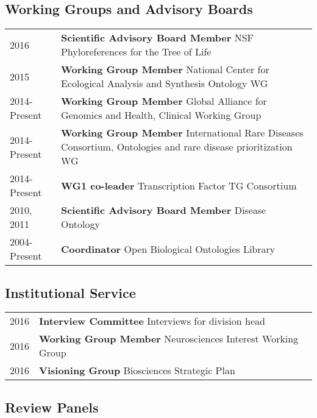 \documentclass[11pt,fullpage]{article}
\begin{document}
\subsection*{Working Groups and Advisory Boards}

\begin{longtable}{p{0.5in}|p{5.5in}}

  2016  & \textbf{Scientific Advisory Board Member} NSF Phyloreferences for the Tree of Life \\
  2015  & \textbf{Working Group Member}  National Center for Ecological Analysis and Synthesis Ontology WG \\
  2014-Present  & \textbf{Working Group Member}  Global Alliance for Genomics and Health, Clinical Working Group \\
  2014-Present  & \textbf{Working Group Member}  International Rare Diseases Consortium, Ontologies and rare disease prioritization WG \\
  2014-Present  & \textbf{WG1 co-leader} Transcription Factor TG Consortium \\
  2010, 2011 & \textbf{Scientific Advisory Board Member} Disease Ontology \\
  2004-Present  & \textbf{Coordinator} Open Biological Ontologies Library \\

\end{longtable}

\subsection*{Institutional Service}

\begin{longtable}{p{0.5in}|p{5.5in}}

  2016 & \textbf{Interview Committee} Interviews for division head \\
  2016 & \textbf{Working Group Member} Neurosciences Interest Working Group \\
  2016 & \textbf{Visioning Group} Biosciences Strategic Plan \\

\end{longtable}

\subsection*{Review Panels}
\end{document}
